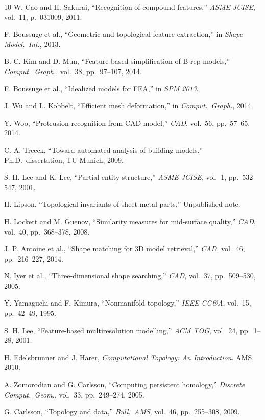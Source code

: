 \documentclass[journal,twocolumn,10pt]{IEEEtran}
\begin{document}
\begin{thebibliography}{10}
W. Cao and H. Sakurai, ``Recognition of compound features,''
\emph{ASME JCISE}, vol.~11, p.~031009, 2011.

F. Boussuge et al., ``Geometric and topological feature extraction,''
in \emph{Shape Model.\ Int.}, 2013.

B. C. Kim and D. Mun, ``Feature-based simplification of B-rep models,''
\emph{Comput.\ Graph.}, vol.~38, pp.~97--107, 2014.

F. Boussuge et al., ``Idealized models for FEA,'' in \emph{SPM 2013}.

J. Wu and L. Kobbelt, ``Efficient mesh deformation,'' in
\emph{Comput.\ Graph.}, 2014.

Y. Woo, ``Protrusion recognition from CAD model,''
\emph{CAD}, vol.~56, pp.~57--65, 2014.

C. A. Treeck, ``Toward automated analysis of building models,''
Ph.D.\ dissertation, TU Munich, 2009.

S. H. Lee and K. Lee, ``Partial entity structure,''
\emph{ASME JCISE}, vol.~1, pp.~532--547, 2001.

H. Lipson, ``Topological invariants of sheet metal parts,'' Unpublished note.

H. Lockett and M. Guenov, ``Similarity measures for mid-surface quality,''
\emph{CAD}, vol.~40, pp.~368--378, 2008.

J. P. Antoine et al., ``Shape matching for 3D model retrieval,''
\emph{CAD}, vol.~46, pp.~216--227, 2014.

N. Iyer et al., ``Three-dimensional shape searching,''
\emph{CAD}, vol.~37, pp.~509--530, 2005.

Y. Yamaguchi and F. Kimura, ``Nonmanifold topology,''
\emph{IEEE CG\&A}, vol.~15, pp.~42--49, 1995.

S. H. Lee, ``Feature-based multiresolution modelling,''
\emph{ACM TOG}, vol.~24, pp.~1--28, 2001.

H. Edelsbrunner and J. Harer,
\emph{Computational Topology: An Introduction}.
AMS, 2010.

A. Zomorodian and G. Carlsson, ``Computing persistent homology,''
\emph{Discrete Comput.\ Geom.}, vol.~33, pp.~249--274, 2005.

G. Carlsson, ``Topology and data,''
\emph{Bull.\ AMS}, vol.~46, pp.~255--308, 2009.


\end{thebibliography}
\end{document}
